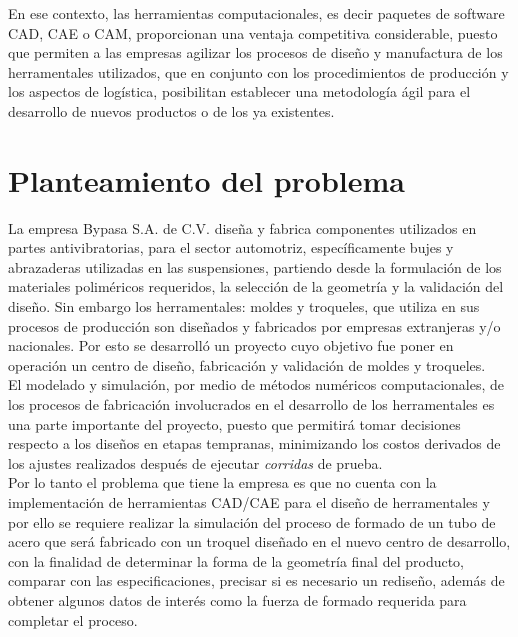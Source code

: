 En ese contexto, las herramientas computacionales, es decir paquetes de software CAD, CAE o CAM, 
proporcionan una ventaja competitiva considerable, puesto que permiten a las empresas agilizar 
los procesos de diseño y manufactura de los herramentales utilizados, que 
en conjunto con los procedimientos de producción y los aspectos de logística, posibilitan  
establecer una metodología ágil para el desarrollo de nuevos productos o de los ya existentes.





\section{Planteamiento del problema}

La empresa Bypasa S.A. de C.V. diseña y fabrica componentes utilizados en partes antivibratorias, 
para el sector automotriz, específicamente bujes y abrazaderas utilizadas en las suspensiones, 
partiendo desde la formulación de los materiales poliméricos requeridos, la selección de la geometría 
y la validación del diseño. Sin embargo los herramentales: moldes y troqueles, que utiliza en sus 
procesos de producción son diseñados y fabricados por empresas extranjeras y/o nacionales. Por esto 
se desarrolló un proyecto cuyo objetivo fue poner en operación un centro de diseño, fabricación 
y validación de moldes y troqueles.\\

El modelado y simulación, por medio de métodos numéricos computacionales, de los procesos de fabricación 
involucrados en el desarrollo de los herramentales es una parte importante del proyecto, puesto que 
permitirá tomar decisiones respecto a los diseños en etapas tempranas, minimizando los costos derivados de 
los ajustes realizados después de ejecutar \textit{corridas} de prueba.\\

Por lo tanto el problema que tiene la empresa es que no cuenta con la implementación de herramientas 
CAD/CAE para el diseño de herramentales y por ello se requiere realizar la simulación del proceso de formado de un 
tubo de acero que será fabricado con un troquel diseñado en el nuevo centro de desarrollo, 
con la finalidad de determinar la forma de la geometría final del producto, comparar con las especificaciones, 
precisar si es necesario un rediseño, además de obtener algunos datos de interés como la fuerza de formado 
requerida para completar el proceso.

